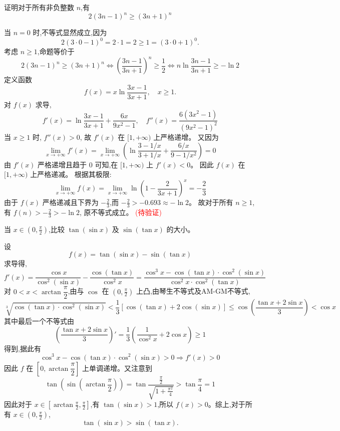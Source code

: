 \begin{questions}
    \question 证明对于所有非负整数 $n$,有
    \[
    2(3n-1)^n \ge (3n+1)^n
    \]
    \begin{solution}
        当 $n=0$ 时,不等式显然成立,因为
        \[
        2(3\cdot 0 - 1)^0 = 2 \cdot 1 = 2 \ge 1 = (3\cdot 0 + 1)^0.
        \]
        考虑 $n \ge 1$,命题等价于
        \[
        2(3n-1)^n \ge (3n+1)^n
        \Longleftrightarrow \left(\frac{3n-1}{3n+1}\right)^n \ge \frac{1}{2}
        \Longleftrightarrow n \ln \frac{3n-1}{3n+1} \ge -\ln 2
        \]
        定义函数
        \[
        f(x) = x \ln \frac{3x-1}{3x+1}, \quad x \ge 1.
        \]
        对 $f(x)$ 求导,
        \[
        f'(x) = \ln \frac{3x-1}{3x+1} + \frac{6x}{9x^2 -1},\quad f''(x) = \frac{6(3x^2-1)}{(9x^2-1)^2}
        \]
        当 $x \ge 1$ 时, $f''(x) > 0$, 故 $f'(x)$ 在 $[1, +\infty)$ 上严格递增。
        又因为
        \[
        \lim_{x \to +\infty} f'(x) = \lim_{x \to +\infty} \left( \ln \frac{3-1/x}{3+1/x} + \frac{6/x}{9-1/x^2} \right) = 0
        \]
        由 $f'(x)$ 严格递增且趋于 0 可知,在 $[1, +\infty)$ 上 $f'(x) < 0$。
        因此 $f(x)$ 在 $[1, +\infty)$ 上严格递减。
        根据其极限:
        \[
        \lim_{x \to +\infty} f(x) = \lim_{x \to +\infty} \ln \left( 1 - \frac{2}{3x+1} \right)^x = -\frac{2}{3}
        \]
        由于 $f(x)$ 严格递减且下界为 $-\frac{2}{3}$,而 $-\frac{2}{3} > -0.693 \approx -\ln 2$。
        故对于所有 $n \ge 1$, 有 $f(n) > -\frac{2}{3} > -\ln 2$, 原不等式成立。
        \textcolor{red}{(待验证)}
    \end{solution}

    \question 当 $x \in (0, \frac{\pi}{2})$,比较 $\tan(\sin x)$ 及 $\sin(\tan x)$ 的大小。
    \begin{solution}
        设
        \[
        f(x) = \tan(\sin x) - \sin(\tan x)
        \]
        求导得,
        \[
        f'(x) = \frac{\cos x}{\cos^2(\sin x)} - \frac{\cos(\tan x)}{\cos^2 x} = \frac{\cos^3 x - \cos(\tan x)\cdot \cos^2(\sin x)}{\cos^2 x \cdot \cos^2(\tan x)}
        \]
        对 $0 < x < \arctan \dfrac{\pi}{2}$,由与 $\cos$ 在 $(0, \frac{\pi}{2})$ 上凸,由琴生不等式及AM-GM不等式,
        \[
        \sqrt[3]{\cos(\tan x)\cdot \cos^2(\sin x)} < \frac{1}{3}[\cos(\tan x) + 2\cos(\sin x)] \le \cos\left(\frac{\tan x + 2\sin x}{3}\right) < \cos x
        \]
        其中最后一个不等式由
        \[
        \left(\frac{\tan x + 2\sin x}{3}\right)' = \frac{1}{3}\left(\frac{1}{\cos^2 x} + 2\cos x\right) \ge 1
        \]
        得到,据此有
        \[
        \cos^3 x - \cos(\tan x) \cdot \cos^2(\sin x) > 0 \Rightarrow f'(x) > 0
        \]
        因此 $f$ 在 $\left[0, \arctan \dfrac{\pi}{2}\right]$ 上单调递增。又注意到
        \[
        \tan\left(\sin(\arctan \frac{\pi}{2})\right) = \tan\frac{\frac{\pi}{2}}{\sqrt{1+\frac{\pi^2}{4}}} > \tan\frac{\pi}{4} = 1
        \]
        因此对于 $x \in \left[\arctan \frac{\pi}{2}, \frac{\pi}{2}\right]$,有 $\tan(\sin x) > 1$,所以 $f(x) > 0$。综上,对于所有 $x \in (0, \frac{\pi}{2})$,
        \[
        \tan(\sin x) > \sin(\tan x).
        \]
    \end{solution}


\end{questions}
